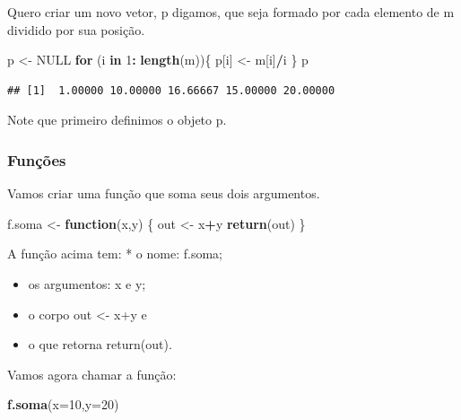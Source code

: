 \documentclass[
]{book}
\newenvironment{Shaded}{\begin{snugshade}}{\end{snugshade}}
\newcommand{\ControlFlowTok}[1]{\textcolor[rgb]{0.13,0.29,0.53}{\textbf{#1}}}
\newcommand{\DataTypeTok}[1]{\textcolor[rgb]{0.13,0.29,0.53}{#1}}
\newcommand{\DecValTok}[1]{\textcolor[rgb]{0.00,0.00,0.81}{#1}}
\newcommand{\KeywordTok}[1]{\textcolor[rgb]{0.13,0.29,0.53}{\textbf{#1}}}
\newcommand{\NormalTok}[1]{#1}
\newcommand{\OperatorTok}[1]{\textcolor[rgb]{0.81,0.36,0.00}{\textbf{#1}}}
\newcommand{\OtherTok}[1]{\textcolor[rgb]{0.56,0.35,0.01}{#1}}
\newcommand{\StringTok}[1]{\textcolor[rgb]{0.31,0.60,0.02}{#1}}
\begin{document}
Quero criar um novo vetor, p digamos, que seja formado por cada elemento
de m dividido por sua posição.

\begin{Shaded}
\begin{Highlighting}[]
\NormalTok{p <-}\StringTok{ }\OtherTok{NULL}
\ControlFlowTok{for}\NormalTok{ (i }\ControlFlowTok{in} \DecValTok{1}\OperatorTok{:}\StringTok{ }\KeywordTok{length}\NormalTok{(m))\{}
\NormalTok{  p[i] <-}\StringTok{ }\NormalTok{m[i]}\OperatorTok{/}\NormalTok{i}
\NormalTok{\}}
\NormalTok{p}
\end{Highlighting}
\end{Shaded}

\begin{verbatim}
## [1]  1.00000 10.00000 16.66667 15.00000 20.00000
\end{verbatim}

Note que primeiro definimos o objeto p.~

\hypertarget{funuxe7uxf5es}{%
\subsubsection{Funções}\label{funuxe7uxf5es}}

Vamos criar uma função que soma seus dois argumentos.

\begin{Shaded}
\begin{Highlighting}[]
\NormalTok{f.soma <-}\StringTok{ }\ControlFlowTok{function}\NormalTok{(x,y) \{}
\NormalTok{  out <-}\StringTok{ }\NormalTok{x}\OperatorTok{+}\NormalTok{y}
  \KeywordTok{return}\NormalTok{(out)}
\NormalTok{\}}
\end{Highlighting}
\end{Shaded}

A função acima tem:
* o nome: f.soma;

\begin{itemize}
\item
  os argumentos: x e y;
\item
  o corpo out \textless- x+y e
\item
  o que retorna return(out).
\end{itemize}

Vamos agora chamar a função:

\begin{Shaded}
\begin{Highlighting}[]
\KeywordTok{f.soma}\NormalTok{(}\DataTypeTok{x=}\DecValTok{10}\NormalTok{,}\DataTypeTok{y=}\DecValTok{20}\NormalTok{)}
\end{Highlighting}
\end{Shaded}
\end{document}
